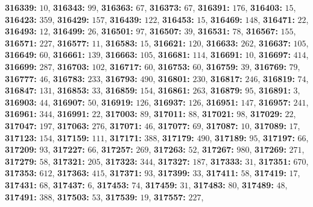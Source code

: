 \textsf{\bfseries 316339:} $10$, \textsf{\bfseries 316343:} $99$, \textsf{\bfseries 316363:} $67$, \textsf{\bfseries 316373:} $67$, \textsf{\bfseries 316391:} $176$, \textsf{\bfseries 316403:} $15$, \textsf{\bfseries 316423:} $359$, \textsf{\bfseries 316429:} $157$, \textsf{\bfseries 316439:} $122$, \textsf{\bfseries 316453:} $15$, \textsf{\bfseries 316469:} $148$, \textsf{\bfseries 316471:} $22$, \textsf{\bfseries 316493:} $12$, \textsf{\bfseries 316499:} $26$, \textsf{\bfseries 316501:} $97$, \textsf{\bfseries 316507:} $39$, \textsf{\bfseries 316531:} $78$, \textsf{\bfseries 316567:} $155$, \textsf{\bfseries 316571:} $227$, \textsf{\bfseries 316577:} $11$, \textsf{\bfseries 316583:} $15$, \textsf{\bfseries 316621:} $120$, \textsf{\bfseries 316633:} $262$, \textsf{\bfseries 316637:} $105$, \textsf{\bfseries 316649:} $60$, \textsf{\bfseries 316661:} $139$, \textsf{\bfseries 316663:} $105$, \textsf{\bfseries 316681:} $114$, \textsf{\bfseries 316691:} $10$, \textsf{\bfseries 316697:} $414$, \textsf{\bfseries 316699:} $287$, \textsf{\bfseries 316703:} $102$, \textsf{\bfseries 316717:} $60$, \textsf{\bfseries 316753:} $60$, \textsf{\bfseries 316759:} $39$, \textsf{\bfseries 316769:} $79$, \textsf{\bfseries 316777:} $46$, \textsf{\bfseries 316783:} $233$, \textsf{\bfseries 316793:} $490$, \textsf{\bfseries 316801:} $230$, \textsf{\bfseries 316817:} $246$, \textsf{\bfseries 316819:} $74$, \textsf{\bfseries 316847:} $131$, \textsf{\bfseries 316853:} $33$, \textsf{\bfseries 316859:} $154$, \textsf{\bfseries 316861:} $263$, \textsf{\bfseries 316879:} $95$, \textsf{\bfseries 316891:} $3$, \textsf{\bfseries 316903:} $44$, \textsf{\bfseries 316907:} $50$, \textsf{\bfseries 316919:} $126$, \textsf{\bfseries 316937:} $126$, \textsf{\bfseries 316951:} $147$, \textsf{\bfseries 316957:} $241$, \textsf{\bfseries 316961:} $344$, \textsf{\bfseries 316991:} $22$, \textsf{\bfseries 317003:} $89$, \textsf{\bfseries 317011:} $88$, \textsf{\bfseries 317021:} $98$, \textsf{\bfseries 317029:} $22$, \textsf{\bfseries 317047:} $197$, \textsf{\bfseries 317063:} $276$, \textsf{\bfseries 317071:} $46$, \textsf{\bfseries 317077:} $69$, \textsf{\bfseries 317087:} $10$, \textsf{\bfseries 317089:} $17$, \textsf{\bfseries 317123:} $154$, \textsf{\bfseries 317159:} $111$, \textsf{\bfseries 317171:} $388$, \textsf{\bfseries 317179:} $490$, \textsf{\bfseries 317189:} $95$, \textsf{\bfseries 317197:} $66$, \textsf{\bfseries 317209:} $93$, \textsf{\bfseries 317227:} $66$, \textsf{\bfseries 317257:} $269$, \textsf{\bfseries 317263:} $52$, \textsf{\bfseries 317267:} $980$, \textsf{\bfseries 317269:} $271$, \textsf{\bfseries 317279:} $58$, \textsf{\bfseries 317321:} $205$, \textsf{\bfseries 317323:} $344$, \textsf{\bfseries 317327:} $187$, \textsf{\bfseries 317333:} $31$, \textsf{\bfseries 317351:} $670$, \textsf{\bfseries 317353:} $612$, \textsf{\bfseries 317363:} $415$, \textsf{\bfseries 317371:} $93$, \textsf{\bfseries 317399:} $33$, \textsf{\bfseries 317411:} $58$, \textsf{\bfseries 317419:} $17$, \textsf{\bfseries 317431:} $68$, \textsf{\bfseries 317437:} $6$, \textsf{\bfseries 317453:} $74$, \textsf{\bfseries 317459:} $31$, \textsf{\bfseries 317483:} $80$, \textsf{\bfseries 317489:} $48$, \textsf{\bfseries 317491:} $388$, \textsf{\bfseries 317503:} $53$, \textsf{\bfseries 317539:} $19$, \textsf{\bfseries 317557:} $227$, 
